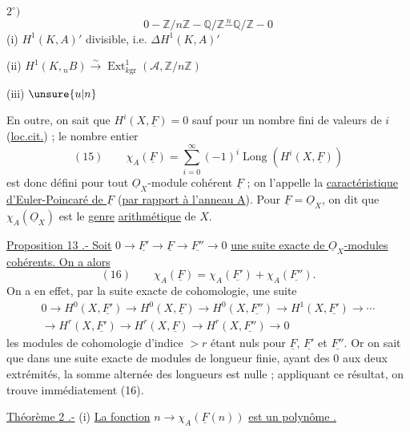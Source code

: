 \noindent $2^\circ)$
\[
0\mathrel{-}\mathbb Z/n\mathbb Z\mathrel{-}\mathbb Q/\mathbb Z\overset{n}{\mathrel{-}}\mathbb Q/\mathbb Z\mathrel{-}0
\]
\noindent (i) $H^1(K,A)'$ divisible, i.e. $\Delta H^1(K,A)'$  

\noindent (ii) $H^1(K,{}_nB)\xrightarrow{\sim}\operatorname{Ext}^1_{k\mathrm{gr}}(\mathcal A,\mathbb Z/n\mathbb Z)$

\noindent (iii) $\unsure{u|n}$

En outre, on sait que $H^i(X,\underline F)=0$ sauf pour un nombre fini de valeurs de $i$ (\uline{loc.cit.}) ; le nombre entier
\[
(15)\qquad\chi_A(\underline F)=\sum_{i=0}^{\infty}(-1)^i\operatorname{Long}(H^i(X,\underline F))
\]
est donc défini pour tout $\underline O_X$-module cohérent $\underline F$ ; on l'appelle la \uline{caractéristique d'Euler-Poincaré de $\underline F$} (\uline{par rapport à l'anneau A}).
Pour $\underline F=\underline O_X$, on dit que $\chi_A(\underline O_X)$ est le \uline{genre}  \uline{arithmétique} de $X$.

\uline{Proposition 13 .- Soit} $0\to\underline{F'}\to\underline F\to\underline{F''}\to0$ \uline{une suite exacte de $\underline O_X$-modules cohérents. On a alors}
\[
(16)\qquad\chi_A(\underline F)=\chi_A(\underline{F'})+\chi_A(\underline{F''}).
\]
On a en effet, par la suite exacte de cohomologie, une suite 
\[
\begin{gathered}
0\to H^0(X,\underline{F'})\to H^0(X,\underline F)\to H^0(X,\underline{F''})\to H^1(X,\underline{F'})\to\cdots\\
\to H^r(X,\underline{F'})\to H^r(X,\underline F)\to H^r(X,\underline{F''})\to0
\end{gathered}
\]
 les modules de cohomologie d'indice $>r$ étant nuls pour $\underline F$, $\underline{F'}$ et $\underline{F''}$. Or on sait que dans une suite exacte de modules de longueur finie, ayant des 0 aux deux extrémités, la somme alternée des longueurs est nulle ; appliquant ce résultat, on trouve immédiatement (16).

\uline{Théorème 2 .-} 
(i)  \uline{La fonction} $n\to\chi_A(\underline F(n))$ \uline{est  un polynôme .}

